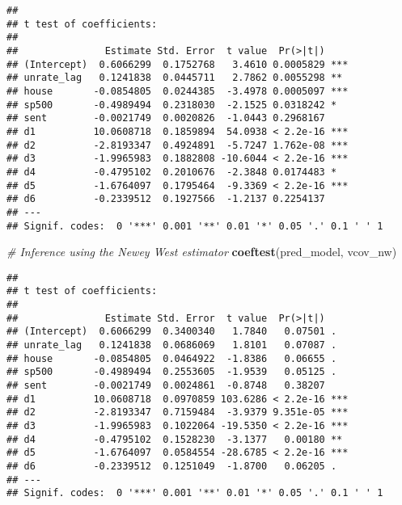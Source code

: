 \documentclass[
]{book}
\newenvironment{Shaded}{\begin{snugshade}}{\end{snugshade}}
\newcommand{\AttributeTok}[1]{\textcolor[rgb]{0.13,0.29,0.53}{#1}}
\newcommand{\CommentTok}[1]{\textcolor[rgb]{0.56,0.35,0.01}{\textit{#1}}}
\newcommand{\FloatTok}[1]{\textcolor[rgb]{0.00,0.00,0.81}{#1}}
\newcommand{\FunctionTok}[1]{\textcolor[rgb]{0.13,0.29,0.53}{\textbf{#1}}}
\newcommand{\NormalTok}[1]{#1}
\newcommand{\SpecialCharTok}[1]{\textcolor[rgb]{0.81,0.36,0.00}{\textbf{#1}}}
\newcommand{\StringTok}[1]{\textcolor[rgb]{0.31,0.60,0.02}{#1}}
\begin{document}
\begin{verbatim}
## 
## t test of coefficients:
## 
##               Estimate Std. Error  t value  Pr(>|t|)    
## (Intercept)  0.6066299  0.1752768   3.4610 0.0005829 ***
## unrate_lag   0.1241838  0.0445711   2.7862 0.0055298 ** 
## house       -0.0854805  0.0244385  -3.4978 0.0005097 ***
## sp500       -0.4989494  0.2318030  -2.1525 0.0318242 *  
## sent        -0.0021749  0.0020826  -1.0443 0.2968167    
## d1          10.0608718  0.1859894  54.0938 < 2.2e-16 ***
## d2          -2.8193347  0.4924891  -5.7247 1.762e-08 ***
## d3          -1.9965983  0.1882808 -10.6044 < 2.2e-16 ***
## d4          -0.4795102  0.2010676  -2.3848 0.0174483 *  
## d5          -1.6764097  0.1795464  -9.3369 < 2.2e-16 ***
## d6          -0.2339512  0.1927566  -1.2137 0.2254137    
## ---
## Signif. codes:  0 '***' 0.001 '**' 0.01 '*' 0.05 '.' 0.1 ' ' 1
\end{verbatim}

\begin{Shaded}
\begin{Highlighting}[]
\CommentTok{\# Inference using the Newey West estimator}
\FunctionTok{coeftest}\NormalTok{(pred\_model, vcov\_nw)}
\end{Highlighting}
\end{Shaded}

\begin{verbatim}
## 
## t test of coefficients:
## 
##               Estimate Std. Error  t value  Pr(>|t|)    
## (Intercept)  0.6066299  0.3400340   1.7840   0.07501 .  
## unrate_lag   0.1241838  0.0686069   1.8101   0.07087 .  
## house       -0.0854805  0.0464922  -1.8386   0.06655 .  
## sp500       -0.4989494  0.2553605  -1.9539   0.05125 .  
## sent        -0.0021749  0.0024861  -0.8748   0.38207    
## d1          10.0608718  0.0970859 103.6286 < 2.2e-16 ***
## d2          -2.8193347  0.7159484  -3.9379 9.351e-05 ***
## d3          -1.9965983  0.1022064 -19.5350 < 2.2e-16 ***
## d4          -0.4795102  0.1528230  -3.1377   0.00180 ** 
## d5          -1.6764097  0.0584554 -28.6785 < 2.2e-16 ***
## d6          -0.2339512  0.1251049  -1.8700   0.06205 .  
## ---
## Signif. codes:  0 '***' 0.001 '**' 0.01 '*' 0.05 '.' 0.1 ' ' 1
\end{verbatim}

\begin{Shaded}
\end{Shaded}
\end{document}
